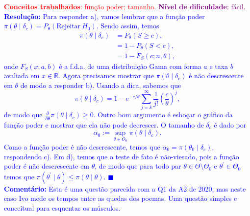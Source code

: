 \textcolor{red}{\textbf{Conceitos trabalhados}: função poder; tamanho.}
\textcolor{purple}{\textbf{Nível de dificuldade}: fácil.}\\
\textcolor{blue}{
\textbf{Resolução:}
Para responder a), vamos lembrar que a função poder $\pi(\theta \mid \delta_c) = P_\theta\left(\textrm{Rejeitar}\: H_0\right)$.
Sendo assim, temos
\begin{align*}
    \pi(\theta \mid \delta_c) &= P_\theta\left(S \geq c\right),\\
    &= 1 - P_\theta(S < c),\\
    &= 1 - F_S\left(c; n, \theta \right),
\end{align*}
onde $F_S\left(x; a, b\right)$ é a f.d.a. de uma distribuição Gama com forma $a$ e taxa $b$ avaliada em $x \in \mathbb{R}$. 
Agora precisamos mostrar que $\pi(\theta \mid \delta_c)$ é não descrescente em $\theta$ de modo a responder b).
Usando a dica, sabemos que 
\begin{equation*}
    \pi(\theta \mid \delta_c) = 1 - e^{-c/\theta}\sum_{j = k}^\infty \frac{1}{j!}\left(\frac{c}{\theta}\right)^j,
\end{equation*}
de modo que $\frac{\partial}{\partial \theta}\pi(\theta \mid \delta_c) \geq 0$.
Outro bom argumento é esboçar o gráfico da função poder e mostrar que ela não pode decrescer.
O tamanho de $\delta_c$ é dado por
\begin{equation*}
    \alpha_0 := \sup_{\theta \in \Theta_0} \pi(\theta \mid \delta_c).
\end{equation*}
Como a função poder é não descrescente, temos que $\alpha_0 = \pi(\theta_0 \mid \delta_c)$, respondendo c).
Em d), temos que o teste de fato é não-viesado, pois a função poder é não descrescente em $\theta$, de modo que para todo par $\theta \in \Theta \setminus \Theta_0$ e $\theta^\prime \in \Theta_0$ temos que $\pi(\theta^\prime \mid \theta) \leq \pi(\theta \mid \theta)$.
$\blacksquare$\\
\textbf{Comentário:} Esta é uma questão parecida com a Q1 da A2 de 2020, mas neste caso Ivo mede os tempos entre as quedas dos poemas. Uma questão simples e conceitual para esquentar os músculos.
}